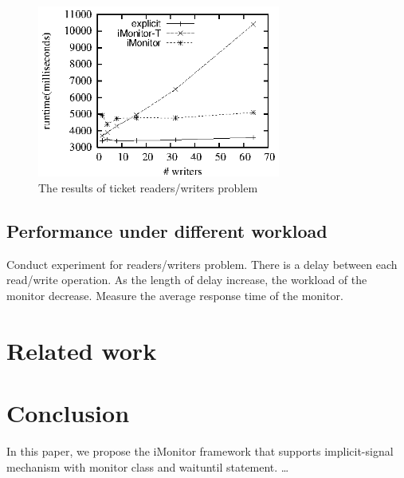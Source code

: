 \documentclass[preprint]{sigplanconf}
\begin{document}



\begin{figure}[ht!]
  \centering
  \includegraphics[width=80mm]{fig/trw.eps}
  \caption{The results of ticket readers/writers problem}
  \label{fig:rw_eval}
\end{figure}

\subsection{Performance under different workload}
Conduct experiment for readers/writers problem. There is a delay between each
read/write operation. As the length of delay increase, the workload of the
monitor decrease. Measure the average response time of the monitor. 

\section{Related work} \label{sec:related}
\section{Conclusion} \label{sec:conclu}
In this paper, we propose the iMonitor framework that supports implicit-signal
mechanism with monitor class and waituntil statement. \dots
\end{document}
